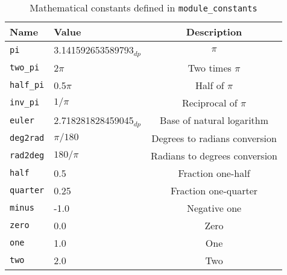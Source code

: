 \documentclass[12pt,a4paper]{report}
\begin{document}
\begin{table}[h!]
\centering
\caption{Mathematical constants defined in \texttt{module\_constants}}
\begin{tabular}{llc}
\hline
\textbf{Name} & \textbf{Value} & \textbf{Description} \\
\hline
\texttt{pi}      & 3.141592653589793$_{dp}$ & $\pi$ \\
\texttt{two\_pi} & 2$\pi$ & Two times $\pi$ \\
\texttt{half\_pi}& 0.5$\pi$ & Half of $\pi$ \\
\texttt{inv\_pi} & $1/\pi$ & Reciprocal of $\pi$ \\
\texttt{euler}& 2.718281828459045$_{dp}$ & Base of natural logarithm \\
\texttt{deg2rad} & $\pi/180$ & Degrees to radians conversion \\
\texttt{rad2deg} & $180/\pi$ & Radians to degrees conversion \\
\texttt{half}    & 0.5 & Fraction one-half \\
\texttt{quarter} & 0.25 & Fraction one-quarter \\
\texttt{minus}   & -1.0 & Negative one \\
\texttt{zero}    & 0.0 & Zero \\
\texttt{one}     & 1.0 & One \\
\texttt{two}     & 2.0 & Two \\
\hline
\end{tabular}
\end{table}
\end{document}
